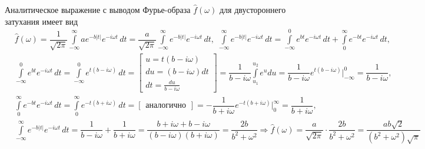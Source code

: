 \documentclass[a4paper, 16pt]{article}
\begin{document}
    \noindent Аналитическое выражение с выводом Фурье-образа
    $\hat{f}(\omega)$ для двустороннего затухания имеет вид
    \begin{align*}
        & \hat{f}(\omega)=\dfrac{1}{\sqrt{2\pi}}\int\limits_{-\infty}^{\infty}ae^{-b|t|}e^{-i\omega t}\,dt=\dfrac{a}{\sqrt{2\pi}}\int\limits_{-\infty}^{\infty}e^{-b|t|}e^{-i\omega t}\,dt,\,\,\int\limits_{-\infty}^{\infty}e^{-b|t|}e^{-i\omega t}\,dt=\int\limits_{-\infty}^{0}e^{bt}e^{-i\omega t}\,dt+\int\limits_{0}^{\infty}e^{-bt}e^{-i\omega t}\,dt,\\
        & \int\limits_{-\infty}^{0}e^{bt}e^{-i\omega t}\,dt=\int\limits_{-\infty}^{0}e^{t(b-i\omega)}\,dt=
        \begin{bmatrix}
            u=t(b-i\omega)\\
            du=(b-i\omega)dt\\
            dt=\frac{du}{b-i\omega}
        \end{bmatrix}=
        \dfrac{1}{b-i\omega}\int\limits_{u_1}^{u_2}e^{u}du=\dfrac{1}{b-i\omega}e^{t(b-i\omega)}\bigg|_{-\infty}^{0}=\dfrac{1}{b-i\omega},\\
        & \int\limits_{0}^{\infty}e^{-bt}e^{-i\omega t}\,dt=\int\limits_{0}^{\infty}e^{-t(b+i\omega)}\,dt=
        \begin{bmatrix}
            \text{аналогично}
        \end{bmatrix}=
        -\dfrac{1}{b+i\omega}e^{-t(b+i\omega)}\bigg|_{0}^{\infty}=\dfrac{1}{b+i\omega},\\
        & \int\limits_{-\infty}^{\infty}e^{-b|t|}e^{-i\omega t}\,dt=\dfrac{1}{b-i\omega}+\dfrac{1}{b+i\omega}=\dfrac{b+i\omega + b -i\omega}{(b-i\omega)(b+i\omega)}=\dfrac{2b}{b^2+\omega^2}\Rightarrow\hat{f}(\omega)=\dfrac{a}{\sqrt{2\pi}}\cdot\dfrac{2b}{b^2+\omega^2}=\dfrac{ab\sqrt{2}}{(b^2+\omega^2)\sqrt{\pi}}
    \end{align*}
\end{document}
